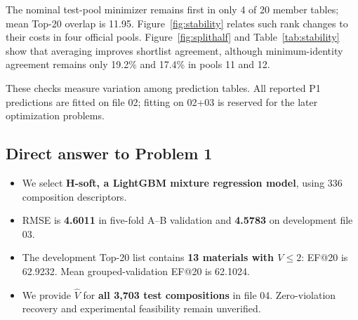 The nominal test-pool minimizer remains first in only 4 of 20 member tables; mean Top-20 overlap is 11.95. Figure~\ref{fig:stability} relates such rank changes to their costs in four official pools. Figure~\ref{fig:splithalf} and Table~\ref{tab:stability} show that averaging improves shortlist agreement, although minimum-identity agreement remains only 19.2\% and 17.4\% in pools 11 and 12.

These checks measure variation among prediction tables. All reported P1 predictions are fitted on file 02; fitting on 02+03 is reserved for the later optimization problems.

\subsection{Direct answer to Problem 1}
\begin{itemize}
  \item We select \textbf{H-soft, a LightGBM mixture regression model}, using 336 composition descriptors.
  \item RMSE is \textbf{4.6011} in five-fold A--B validation and \textbf{4.5783} on development file 03.
  \item The development Top-20 list contains \textbf{13 materials with $V\le2$}: EF@20 is 62.9232. Mean grouped-validation EF@20 is 62.1024.
  \item We provide $\widehat V$ for \textbf{all 3,703 test compositions} in file 04. Zero-violation recovery and experimental feasibility remain unverified.
\end{itemize}
